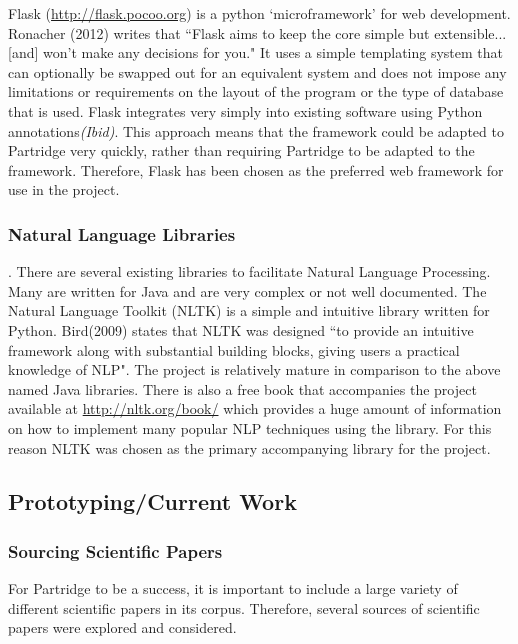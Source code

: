 \documentclass[12pt,a4paper]{article}
\begin{document}
Flask (\url{http://flask.pocoo.org}) is a python `microframework' for web
development. Ronacher (2012) writes that ``Flask aims to keep the core simple
but extensible...[and] won't make any decisions for you\cite{flask2012}." It
uses a simple templating system that can optionally be swapped out for an
equivalent system and does not impose any limitations or requirements on the
layout of the program or the type of database that is used. Flask integrates
very simply into existing software using Python annotations\emph{(Ibid)}. This approach
means that the framework could be adapted to Partridge very quickly, rather
than requiring Partridge to be adapted to the framework. Therefore, Flask has
been chosen as the preferred web framework for use in the project.

\subsubsection{Natural Language Libraries} \label{sec:libschoice}.  There are
several existing libraries to facilitate Natural Language Processing.  Many are
written for Java \cite{mallet2002}\cite{cunningham2011text} and are very
complex or not well documented. The Natural Language Toolkit (NLTK) is a simple
and intuitive library written for Python. Bird(2009) states that NLTK was
designed ``to provide an intuitive framework along with substantial building
blocks, giving users a practical knowledge of NLP\cite{bird2009natural}". The
project is relatively mature in comparison to the above named Java libraries.
There is also a free book that accompanies the project available at
\url{http://nltk.org/book/} which provides a huge amount of information on how
to implement many popular NLP techniques using the library. For this reason
NLTK was chosen as the primary accompanying library for the project.

\subsection{Prototyping/Current Work}

\subsubsection{ Sourcing Scientific Papers}
For Partridge to be a success, it is important to include a large variety of
different scientific papers in its corpus. Therefore, several sources of
scientific papers were explored and considered.
\end{document}
